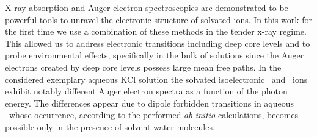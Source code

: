 X-ray absorption and Auger electron spectroscopies are demonstrated to be powerful tools to unravel the electronic structure of solvated ions. In this work for the first time we use a combination of these methods in the tender x-ray regime. %
This allowed us to address electronic transitions including deep core levels and to probe environmental effects, specifically in the bulk of solutions since the Auger electrons created by deep core levels possess large mean free paths. In the considered exemplary aqueous KCl solution the solvated isoelectronic \ki~and \cli~ions exhibit notably different Auger electron spectra as a function of the photon energy. The differences appear due to dipole forbidden transitions in aqueous \ki~whose occurrence, according to the performed {\it ab initio} calculations, becomes possible only in the presence of solvent water molecules.